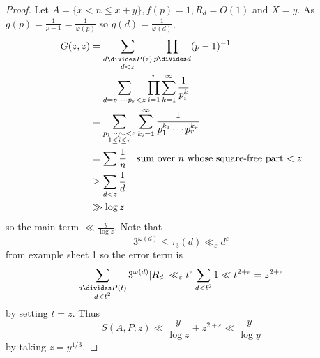 \documentclass[a4paper]{article}
\begin{document}
\begin{proof}
  Let \(A = \{x < n \leq x + y\}, f(p) = 1, R_d = O(1)\) and \(X = y\). As \(g(p) = \frac{1}{p - 1} = \frac{1}{\varphi(p)}\) so \(g(d) = \frac{1}{\varphi(d)}\),
  \begin{align*}
    G(z, z)
    &= \sum_{\substack{d \divides P(z) \\ d < z}} \prod_{p \divides d} (p - 1)^{-1} \\
    &= \sum_{d = p_1 \cdots p_r < z} \prod_{i = 1}^r \sum_{k = 1}^\infty \frac{1}{p_i^k} \\
    &= \sum_{\substack{p_1 \cdots p_r < z \\ 1 \leq i \leq r}} \sum_{k_i = 1}^\infty \frac{1}{p_1^{k_1} \cdots p_r^{k_r}} \\
    &= \sum \frac{1}{n} \quad \text{sum over \(n\) whose square-free part \(< z\)} \\
    &\geq \sum_{d < z} \frac{1}{d} \\
    &\gg \log z
  \end{align*}
  so the main term \(\ll \frac{y}{\log z}\). Note that
  \[
    3^{\omega(d)} \leq \tau_3(d) \ll_\varepsilon d^\varepsilon
  \]
  from example sheet 1 so the error term is
  \[
    \sum_{\substack{d \divides P(t) \\ d < t^2}} 3^{\omega(d)} |R_d|
    \ll_\varepsilon t^\varepsilon \sum_{d < t^2} 1
    \ll t^{2 + \varepsilon} = z^{2 + \varepsilon}
  \]
  by setting \(t = z\). Thus
  \[
    S(A, P; z) \ll \frac{y}{\log z} + z^{2 + \varepsilon} \ll \frac{y}{\log y}
  \]
  by taking \(z = y^{1/3}\).
\end{proof}
\end{document}
